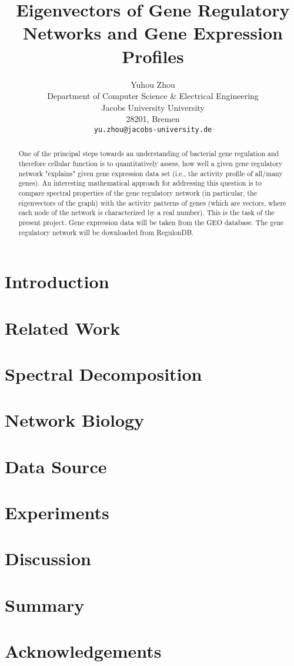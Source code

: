 \documentclass{article} %
\title{Eigenvectors of Gene Regulatory Networks and Gene Expression Profiles}
\author{
Yuhou Zhou\\
Department of Computer Science \& Electrical Engineering\\
Jacobs University University\\
28201, Bremen \\
\texttt{yu.zhou@jacobs-university.de} \\
}
\begin{document}
\maketitle

\begin{abstract}
   One of the principal steps towards an understanding of bacterial gene regulation and therefore cellular function is to quantitatively assess, how well a given gene regulatory network "explains" given gene expression data set (i.e., the activity proﬁle of all/many genes). An interesting mathematical approach for addressing this question is to compare spectral properties of the gene regulatory network (in particular, the eigenvectors of the graph) with the activity patterns of genes (which are vectors, where each node of the network is characterized by a real number). This is the task of the present project. Gene expression data will be taken from the GEO database. The gene regulatory network will be downloaded from RegulonDB.
\end{abstract}

\section{Introduction}

\section{Related Work}

\section{Spectral Decomposition}

\section{Network Biology}

\section{Data Source}

\section{Experiments}

\section{Discussion}

\section{Summary}

\section*{Acknowledgements}



\end{document}
